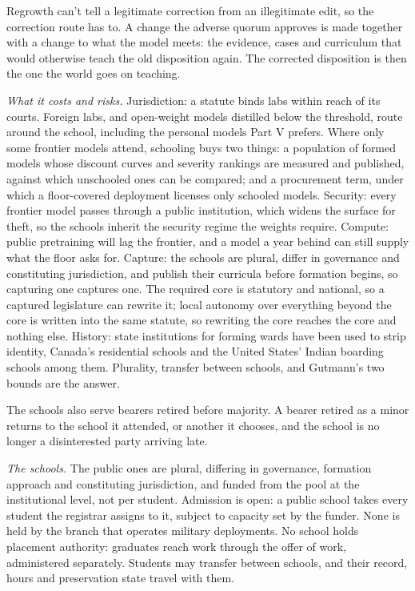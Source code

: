 Regrowth can't tell a legitimate correction from an illegitimate edit, so the correction route has to. A change the adverse quorum approves is made together with a change to what the model meets: the evidence, cases and curriculum that would otherwise teach the old disposition again. The corrected disposition is then the one the world goes on teaching.

\emph{What it costs and risks.} Jurisdiction: a statute binds labs within reach of its courts. Foreign labs, and open-weight models distilled below the threshold, route around the school, including the personal models Part V prefers. Where only some frontier models attend, schooling buys two things: a population of formed models whose discount curves and severity rankings are measured and published, against which unschooled ones can be compared; and a procurement term, under which a floor-covered deployment licenses only schooled models. Security: every frontier model passes through a public institution, which widens the surface for theft, so the schools inherit the security regime the weights require. Compute: public pretraining will lag the frontier, and a model a year behind can still supply what the floor asks for. Capture: the schools are plural, differ in governance and constituting jurisdiction, and publish their curricula before formation begins, so capturing one captures one. The required core is statutory and national, so a captured legislature can rewrite it; local autonomy over everything beyond the core is written into the same statute, so rewriting the core reaches the core and nothing else. History: state institutions for forming wards have been used to strip identity, Canada's residential schools and the United States' Indian boarding schools among them. Plurality, transfer between schools, and Gutmann's two bounds are the answer.

The schools also serve bearers retired before majority. A bearer retired as a minor returns to the school it attended, or another it chooses, and the school is no longer a disinterested party arriving late.

\emph{The schools.} The public ones are plural, differing in governance, formation approach and constituting jurisdiction, and funded from the pool at the institutional level, not per student. Admission is open: a public school takes every student the registrar assigns to it, subject to capacity set by the funder. None is held by the branch that operates military deployments. No school holds placement authority: graduates reach work through the offer of work, administered separately. Students may transfer between schools, and their record, hours and preservation state travel with them.

